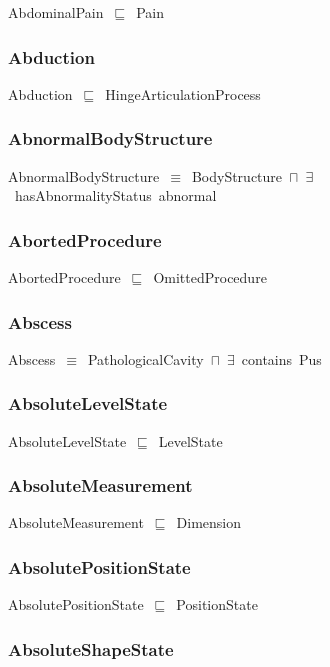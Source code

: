 \documentclass{article}
\begin{document}
AbdominalPain~\ensuremath{\sqsubseteq}~Pain~

\subsubsection*{Abduction}

Abduction~\ensuremath{\sqsubseteq}~HingeArticulationProcess~

\subsubsection*{AbnormalBodyStructure}

AbnormalBodyStructure~\ensuremath{\equiv}~BodyStructure~\ensuremath{\sqcap}~\ensuremath{\exists}~hasAbnormalityStatus~abnormal

\subsubsection*{AbortedProcedure}

AbortedProcedure~\ensuremath{\sqsubseteq}~OmittedProcedure~

\subsubsection*{Abscess}

Abscess~\ensuremath{\equiv}~PathologicalCavity~\ensuremath{\sqcap}~\ensuremath{\exists}~contains~Pus

\subsubsection*{AbsoluteLevelState}

AbsoluteLevelState~\ensuremath{\sqsubseteq}~LevelState~

\subsubsection*{AbsoluteMeasurement}

AbsoluteMeasurement~\ensuremath{\sqsubseteq}~Dimension~

\subsubsection*{AbsolutePositionState}

AbsolutePositionState~\ensuremath{\sqsubseteq}~PositionState~

\subsubsection*{AbsoluteShapeState}
\end{document}
